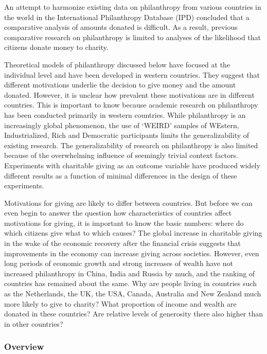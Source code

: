 \documentclass[twocolumn, serif, rga, numeric]{jote-article}
\begin{document}

An attempt to harmonize existing data on philanthropy from various countries in the world in the International Philanthropy Database (IPD)\cite{Wiepking2015} concluded that a comparative analysis of amounts donated is difficult. As a result, previous comparative research on philanthropy is limited to analyses of the likelihood that citizens donate money to charity.\cite{Bekkers2016}

Theoretical models of philanthropy discussed below have focused at the individual level and have been developed in western countries. They suggest that different motivations underlie the decision to give money and the amount donated. However, it is unclear how prevalent these motivations are in different countries. This is important to know because academic research on philanthropy has been conducted primarily in western countries. While philanthropy is an increasingly global phenomenon, the use of `WEIRD' samples of WEstern, Industrialized, Rich and Democratic participants limits the generalizability of existing research.\cite{Henrich2010} The generalizability of research on philanthropy is also limited because of the overwhelming influence of seemingly trivial context factors.\cite{Guala2010, Tammi2013}
Experiments with charitable giving as an outcome variable have produced widely different results as a function of minimal differences in the design of these experiments.

Motivations for giving are likely to differ between countries. But before we can even begin to answer the question how characteristics of countries affect motivations for giving, it is important to know the basic numbers: where do which citizens give what to which causes? 
The global increase in charitable giving in the wake of the economic recovery after the financial crisis suggests that improvements in the economy can increase giving across societies.\cite{Bekkers2015b}
However, even long periods of economic growth and strong increases of wealth have not increased philanthropy in China, India and Russia by much, and the ranking of countries has remained about the same. Why are people living in countries such as the Netherlands, the UK, the USA, Canada, Australia and New Zealand much more likely to give to charity? What proportion of income and wealth are donated in these countries? Are relative levels of generosity there also higher than in other countries? 
 {}\subsubsection*{Overview} 
\end{document}
